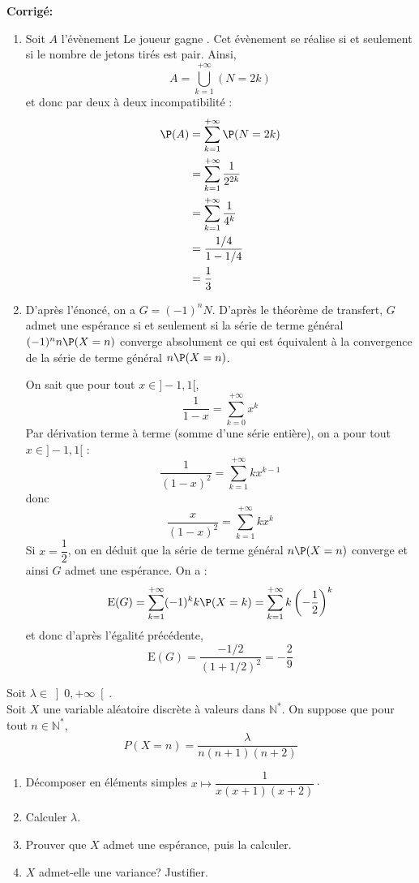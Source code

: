 \documentclass[a4paper,twoside,french,11pt]{VcCours}
\newcommand{\corr}{\textbf{Corrigé:}}
\begin{document}
\corr \begin{enumerate}
\item Soit $A$ l'évènement \og Le joueur gagne \fg . Cet évènement se réalise si et seulement si le nombre de jetons tirés est pair. Ainsi,
$$ A = \bigcup_{k=1}^{+ \infty} (N=2k) $$
et donc par deux à deux incompatibilité :
\begin{align*}
\P(A) & = \sum_{k=1}^{+ \infty} \P(N=2k) \\
& = \sum_{k=1}^{+ \infty} \dfrac{1}{2^{2k}} \\
& = \sum_{k=1}^{+ \infty} \dfrac{1}{4^k} \\
& = \dfrac{1/4}{1-1/4}  \\
& = \dfrac{1}{3} 
\end{align*}
\item D'après l'énoncé, on a $G=(-1)^n N$. D'après le théorème de transfert, $G$ admet une espérance si et seulement si la série de terme général $(-1)^n n \P(X=n)$ converge absolument ce qui est équivalent à la convergence de la série de terme général $n \P(X=n)$.


 On sait que pour tout $x \in ]-1,1[$,
$$ \dfrac{1}{1-x} = \sum_{k=0}^{+ \infty} x^k$$
Par dérivation terme à terme (somme d'une série entière), on a pour tout $x \in ]-1,1[$ :
$$ \dfrac{1}{(1-x)^2} = \sum_{k=1}^{+ \infty} k x^{k-1}$$
donc 
$$ \dfrac{x}{(1-x)^2} = \sum_{k=1}^{+ \infty} kx^k$$
Si $x= \dfrac{1}{2}$, on en déduit que la série de terme général $n \P(X=n)$ converge et ainsi $G$ admet une espérance. On a :
$$ \textrm{E}(G) = \sum_{k=1}^{+ \infty} (-1)^k k \P(X=k) = \sum_{k=1}^{+ \infty} k \left( -\dfrac{1}{2} \right)^k$$
et donc d'après l'égalité précédente,
$$ \textrm{E}(G) = \dfrac{-1/2}{(1+1/2)^2} = - \dfrac{2}{9}$$
\end{enumerate}

\begin{Exercice}{}Soit $\lambda \in{\left] 0,+\infty\right[ }$.\\
Soit $X$ une variable aléatoire discrète à valeurs dans $\mathbb{N}^\ast$. On suppose que pour tout $n \in \mathbb{N}^*$, 
$$P(X=n)=\dfrac{\lambda}{n(n+1)(n+2)} $$
\begin{enumerate}
\item Décomposer en éléments simples $x \mapsto \dfrac{1}{x(x+1)(x+2)} \cdot$
\item
Calculer $\lambda$.
\item
Prouver que $X$ admet une espérance, puis la calculer.
\item
$X$ admet-elle une variance? Justifier.
\end{enumerate}
\end{Exercice}
\end{document}
